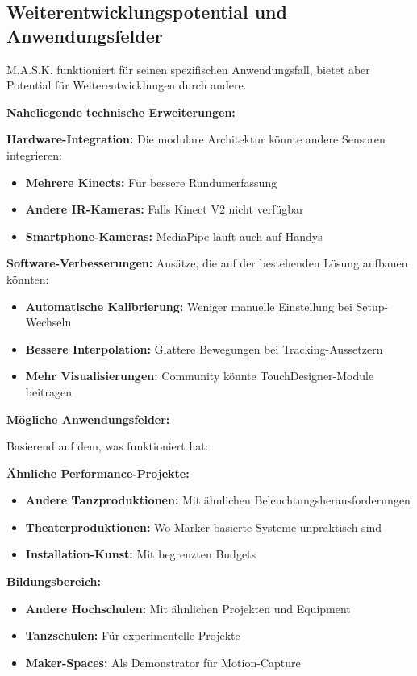 \subsection{Weiterentwicklungspotential und Anwendungsfelder}

M.A.S.K. funktioniert für seinen spezifischen Anwendungsfall, bietet aber Potential für Weiterentwicklungen durch andere.

\textbf{Naheliegende technische Erweiterungen:}

\textbf{Hardware-Integration:}
Die modulare Architektur könnte andere Sensoren integrieren:
\begin{itemize}
    \item \textbf{Mehrere Kinects:} Für bessere Rundumerfassung
    \item \textbf{Andere IR-Kameras:} Falls Kinect V2 nicht verfügbar
    \item \textbf{Smartphone-Kameras:} MediaPipe läuft auch auf Handys
\end{itemize}

\textbf{Software-Verbesserungen:}
Ansätze, die auf der bestehenden Lösung aufbauen könnten:
\begin{itemize}
    \item \textbf{Automatische Kalibrierung:} Weniger manuelle Einstellung bei Setup-Wechseln
    \item \textbf{Bessere Interpolation:} Glattere Bewegungen bei Tracking-Aussetzern
    \item \textbf{Mehr Visualisierungen:} Community könnte TouchDesigner-Module beitragen
\end{itemize}

\textbf{Mögliche Anwendungsfelder:}

Basierend auf dem, was funktioniert hat:

\textbf{Ähnliche Performance-Projekte:}
\begin{itemize}
    \item \textbf{Andere Tanzproduktionen:} Mit ähnlichen Beleuchtungsherausforderungen
    \item \textbf{Theaterproduktionen:} Wo Marker-basierte Systeme unpraktisch sind
    \item \textbf{Installation-Kunst:} Mit begrenzten Budgets
\end{itemize}

\textbf{Bildungsbereich:}
\begin{itemize}
    \item \textbf{Andere Hochschulen:} Mit ähnlichen Projekten und Equipment
    \item \textbf{Tanzschulen:} Für experimentelle Projekte
    \item \textbf{Maker-Spaces:} Als Demonstrator für Motion-Capture
\end{itemize}

